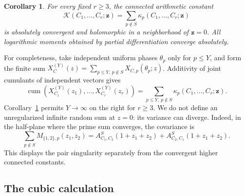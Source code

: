 \documentclass[11pt,reqno]{amsart}
\numberwithin{equation}{section}
\newtheorem{corollary}[theorem]{Corollary}
\theoremstyle{definition}
\theoremstyle{remark}
\begin{document}
\begin{corollary}\label{hi:cumulant-convergence}
For every fixed $r\geq3$, the connected arithmetic constant
\begin{equation}\label{hi:global-cumulant}
 \mathcal K(C_1,\ldots,C_r;\boldsymbol z)
 =\sum_{p\notin S}\kappa_p(C_1,\ldots,C_r;\boldsymbol z)
\end{equation}
is absolutely convergent and holomorphic in a neighborhood of
$\boldsymbol z=0$.  All logarithmic moments obtained by partial
differentiation converge absolutely.
\end{corollary}

For completeness, take independent uniform phases $\theta_p$ only for
$p\leq Y$, and form the finite sum
$X_C^{(Y)}(z)=\sum_{p\leq Y,\ p\notin S}X_{C,p}(\theta_p;z)$.
Additivity of joint cumulants of independent vectors gives
\[
 \operatorname{cum}(X_{C_1}^{(Y)}(z_1),\ldots,X_{C_r}^{(Y)}(z_r))
 =\sum_{p\leq Y,\ p\notin S}\kappa_p(C_1,\ldots,C_r;\boldsymbol z).
\]
Corollary~\ref{hi:cumulant-convergence} permits $Y\to\infty$ on the right
for $r\geq3$.  We do not define an unregularized infinite random sum at
$z=0$: its variance can diverge.  Indeed, in the half-plane where the
prime sum converges, the covariance is
\begin{equation}\label{hi:covariance}
 \sum_{p\notin S}M_{\{1,2\},p}(z_1,z_2)
 =A_{C_1,C_2}^S(1+z_1+z_2)+A_{C_2,C_1}^S(1+z_1+z_2).
\end{equation}
This displays the pair singularity separately from the convergent higher
connected constants.

\subsection{The cubic calculation}
\end{document}
